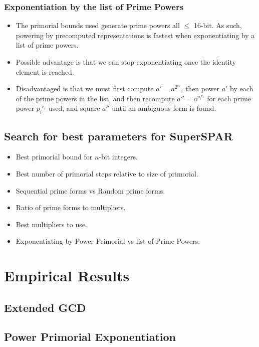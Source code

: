 \documentclass[11pt, letterpaper]{article}
\theoremstyle{definition}
\begin{document}
\subsubsection{Exponentiation by the list of Prime Powers}
\begin{itemize}
\item The primorial bounds used generate prime powers all $\le$ 16-bit.  As such, powering by precomputed representations is fastest when exponentiating by a list of prime powers.
\item Possible advantage is that we can stop exponentiating once the identity element is reached.
\item Disadvantaged is that we must first compute $a' = a^{2^{e_2}}$, then power $a'$ by each of the prime powers in the list, and then recompute $a'' = a^{{p_i}^{e_i}}$ for each prime power ${p_i}^{e_i}$ used, and square $a''$ until an ambiguous form is found.
\end{itemize}



\subsection{Search for best parameters for SuperSPAR}
\begin{itemize}
\item Best primorial bound for $n$-bit integers.
\item Best number of primorial steps relative to size of primorial.
\item Sequential prime forms vs Random prime forms.
\item Ratio of prime forms to multipliers.
\item Best multipliers to use.
\item Exponentiating by Power Primorial vs list of Prime Powers.
\end{itemize}



\bigbreak
\section{Empirical Results}

\subsection{Extended GCD}
\subsection{Power Primorial Exponentiation}
\end{document}
